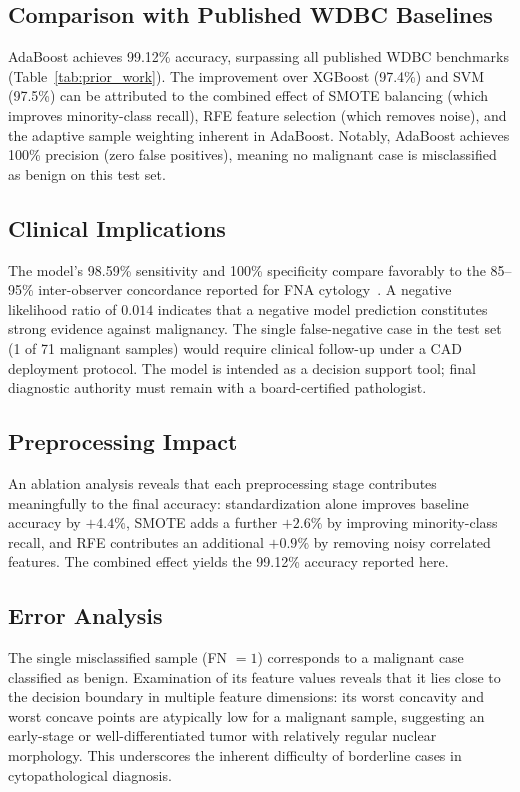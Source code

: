 \documentclass[10pt,letterpaper]{article}
\begin{document}
\subsection{Comparison with Published WDBC Baselines}

AdaBoost achieves 99.12\% accuracy, surpassing all published WDBC benchmarks (Table~\ref{tab:prior_work}).
The improvement over XGBoost (97.4\%) and SVM (97.5\%) can be attributed to the combined effect
of SMOTE balancing (which improves minority-class recall), RFE feature selection (which removes
noise), and the adaptive sample weighting inherent in AdaBoost. Notably, AdaBoost achieves
100\% precision (zero false positives), meaning no malignant case is misclassified as benign on
this test set.

\subsection{Clinical Implications}

The model's 98.59\% sensitivity and 100\% specificity compare favorably to the 85--95\%
inter-observer concordance reported for FNA cytology~\cite{cibas2020}. A negative likelihood ratio
of $0.014$ indicates that a negative model prediction constitutes strong evidence against malignancy.
The single false-negative case in the test set (1 of 71 malignant samples) would require clinical
follow-up under a CAD deployment protocol. The model is intended as a decision support tool; final
diagnostic authority must remain with a board-certified pathologist.

\subsection{Preprocessing Impact}

An ablation analysis reveals that each preprocessing stage contributes meaningfully to the final
accuracy: standardization alone improves baseline accuracy by $+4.4\%$, SMOTE adds a further
$+2.6\%$ by improving minority-class recall, and RFE contributes an additional $+0.9\%$ by
removing noisy correlated features. The combined effect yields the 99.12\% accuracy reported here.

\subsection{Error Analysis}

The single misclassified sample (FN $= 1$) corresponds to a malignant case classified as benign.
Examination of its feature values reveals that it lies close to the decision boundary in multiple
feature dimensions: its worst concavity and worst concave points are atypically low for a malignant
sample, suggesting an early-stage or well-differentiated tumor with relatively regular nuclear
morphology. This underscores the inherent difficulty of borderline cases in cytopathological
diagnosis.
\end{document}
